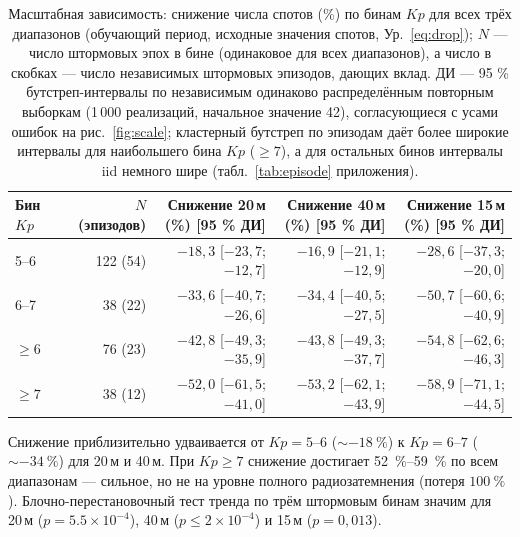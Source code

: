 \documentclass{agujournal2019}
\providecommand{\DIFaddtex}[1]{{\protect\color{blue}\uwave{#1}}} %
\providecommand{\DIFaddFL}[1]{\DIFadd{#1}} %
\providecommand{\DIFaddbeginFL}{} %
\providecommand{\DIFaddendFL}{} %
\providecommand{\DIFadd}[1]{\texorpdfstring{\DIFaddtex{#1}}{#1}} %
\providecommand{\DIFaddincludegraphics}[2][]{{\color{blue}\fbox{\DIFOincludegraphics[#1]{#2}}}} %
\DeclareRobustCommand{\DIFaddbeginFL}{\DIFOaddbeginFL \let\includegraphics\DIFaddincludegraphics} %
\DeclareRobustCommand{\DIFaddendFL}{\DIFOaddendFL \let\includegraphics\DIFOincludegraphics} %
\begin{document}
\begin{table}[h]
	\centering
	\footnotesize
	\setlength{\tabcolsep}{3pt}
	\caption{Масштабная зависимость: снижение числа спотов (\%) по бинам
		$Kp$ для всех трёх диапазонов (обучающий период, исходные значения
		спотов, Ур.~\eqref{eq:drop}\DIFaddbeginFL \DIFaddFL{; с включёнными вспышками, 198 эпох}\DIFaddendFL ); $N$ — число штормовых эпох
		в бине (одинаковое для всех диапазонов), а число в скобках — число независимых
		штормовых эпизодов, дающих вклад. ДИ — 95 \% бутстреп-интервалы по независимым одинаково распределённым повторным выборкам
		(1\,000 реализаций, начальное значение 42), согласующиеся с усами ошибок на
		рис.~\ref{fig:scale}; кластерный бутстреп по эпизодам даёт более
		широкие интервалы для наибольшего бина $Kp$ ($\ge 7$), а для
		остальных бинов интервалы iid немного шире (табл.~\ref{tab:episode} приложения).}
	\label{tab:scale}
	\begin{tabular}{lrrrr}
		\toprule
		Бин $Kp$ & $N$ (эпизодов)
		& \shortstack[b]{Снижение 20\,м\\ (\%) [95 \% ДИ]}
		& \shortstack[b]{Снижение 40\,м\\ (\%) [95 \% ДИ]}
		& \shortstack[b]{Снижение 15\,м\\ (\%) [95 \% ДИ]} \\
		\midrule
		5--6     & 122 (54)
		& $-18{,}3$ [$-23{,}7$; $-12{,}7$]
		& $-16{,}9$ [$-21{,}1$; $-12{,}9$]
		& $-28{,}6$ [$-37{,}3$; $-20{,}0$] \\
		6--7     & 38 (22)
		& $-33{,}6$ [$-40{,}7$; $-26{,}6$]
		& $-34{,}4$ [$-40{,}5$; $-27{,}5$]
		& $-50{,}7$ [$-60{,}6$; $-40{,}9$] \\
		$\ge 6$  & 76 (23)
		& $-42{,}8$ [$-49{,}3$; $-35{,}9$]
		& $-43{,}8$ [$-49{,}3$; $-37{,}7$]
		& $-54{,}8$ [$-62{,}6$; $-46{,}3$] \\
		$\ge 7$  & 38 (12)
		& $-52{,}0$ [$-61{,}5$; $-41{,}0$]
		& $-53{,}2$ [$-62{,}1$; $-43{,}9$]
		& $-58{,}9$ [$-71{,}1$; $-44{,}5$] \\
		\bottomrule
	\end{tabular}
\end{table}

Снижение приблизительно удваивается от $Kp = 5\text{--}6$
($\sim\SI{-18}{\percent}$) к $Kp = 6\text{--}7$ ($\sim\SI{-34}{\percent}$)
для 20\,м и 40\,м. При $Kp \ge 7$ снижение достигает
\SIrange{52}{59}{\percent} по всем диапазонам — сильное, но не на уровне
полного радиозатемнения (потеря $\SI{100}{\percent}$). Блочно-перестановочный
тест тренда по трём штормовым бинам значим для 20\,м ($p = 5.5\times10^{-4}$),
40\,м ($p \le 2\times10^{-4}$) и 15\,м ($p = 0{,}013$).
\end{document}
